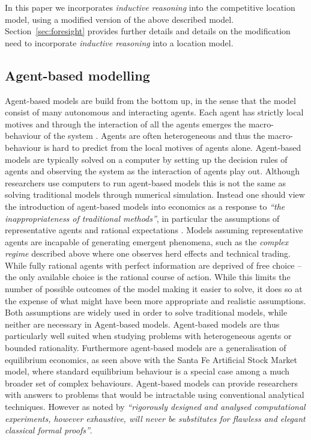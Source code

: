 \documentclass[preprint, 12pt]{elsarticle}
\begin{document}
In this paper we incorporates \emph{inductive reasoning} into the competitive location model, using a modified version of the above described model. Section~\ref{sec:foresight} provides further details and details on the modification need to incorporate \emph{inductive reasoning} into a location model.

\subsection{Agent-based modelling}

Agent-based models are build from the bottom up, in the sense that the model consist of many autonomous and interacting agents. Each agent has strictly local motives and through the interaction of all the agents emerges the macro-behaviour of the system \citep[chapter~2]{Ehrentreich_2007}. Agents are often heterogeneous and thus the macro-behaviour is hard to predict from the local motives of agents alone. Agent-based models are typically solved on a computer by setting up the decision rules of agents and observing the system as the interaction of agents play out. Although researchers use computers to run agent-based models this is not the same as solving traditional models through numerical simulation. Instead one should view the introduction of agent-based models into economics as a response to \emph{``the inappropriateness of traditional methods''}, in particular the assumptions of representative agents and rational expectations \citep[chapter~2, p.~7]{Ehrentreich_2007}. Models assuming representative agents are incapable of generating emergent phenomena, such as the \emph{complex regime} described above where one observes herd effects and technical trading. While fully rational agents with perfect information are deprived of free choice -- the only available choice is the rational course of action. While this limits the number of possible outcomes of the model making it easier to solve, it does so at the expense of what might have been more appropriate and realistic assumptions. Both assumptions are widely used in order to solve traditional models, while neither are necessary in Agent-based models. Agent-based models are thus particularly well suited when studying problems with heterogeneous agents or bounded rationality. Furthermore agent-based models are a generalisation of equilibrium economics, as seen above with the Santa Fe Artificial Stock Market model, where standard equilibrium behaviour is a special case among a much broader set of complex behaviours. Agent-based models can provide researchers with answers to problems that would be intractable using conventional analytical techniques. However as noted by \citet[p.~viii]{Laver_Sergenti_2011} \emph{``rigorously designed and analysed computational experiments, however exhaustive, will never be substitutes for flawless and elegant classical formal proofs''}. 
\end{document}
